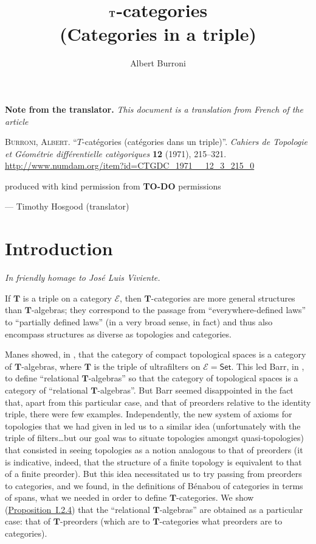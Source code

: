 \documentclass{article}
\title{$\TT$-categories\\(Categories in a triple)}
\author{Albert Burroni}
\date{}
\newcommand{\origcit}{%
  \textsc{Burroni, Albert.}
  ``$T$-catégories (catégories dans un triple)''.
  \emph{Cahiers de Topologie et Géométrie différentielle catègoriques} \textbf{12} (1971), 215--321.
  {\url{http://www.numdam.org/item?id=CTGDC_1971__12_3_215_0}}
}
\newenvironment{translator}[1]
  {\phantomsection\par\medskip\noindent\small\textbf{#1.}\itshape}
  {\par\medskip}
\newcommand{\oldpage}[1]{\marginpar{\footnotesize$\Big\vert$ \textit{p.~#1}}}
\newcommand{\todo}{{\color{purple}\textbf{TO-DO }}}
\newcommand{\TT}{\mathbf{T}}
\newcommand{\cat}[1]{\mathcal{#1}}
\newcommand{\Cat}[1]{\mathsf{#1}}
\begin{document}
\maketitle

\begin{translator}{Note from the translator}
  This document is a translation from French of the article

  \medskip
  {\normalfont\origcit}

  \medskip
  {\noindent}produced with kind permission from \todo{permissions}

  \hfill--- Timothy Hosgood (translator)
\end{translator}



\section*{Introduction}

\hfill\emph{In friendly homage to José Luis Viviente.}

\bigskip

\oldpage{215}
If $\TT$ is a triple on a category $\cat{E}$, then $\TT$-categories are more general structures than $\TT$-algebras; they correspond to the passage from ``everywhere-defined laws'' to ``partially defined laws'' (in a very broad sense, in fact) and thus also encompass structures as diverse as topologies and categories.

Manes showed, in \cite{Ma}, that the category of compact topological spaces is a category of $\TT$-algebras, where $\TT$ is the triple of ultrafilters on $\cat{E}=\Cat{Set}$.
This led Barr, in \cite{Ba}, to define ``relational $\TT$-algebras'' so that the category of topological spaces is a category of ``relational $\TT$-algebras''.
But Barr seemed disappointed in the fact that, apart from this particular case, and that of preorders relative to the identity triple, there were few examples.
Independently, the new system of axioms for topologies that we had given in \cite{Bu} led us to a similar idea (unfortunately with the triple of filters\ldots but our goal was to situate topologies amongst quasi-topologies) that consisted in seeing topologies as a notion analogous to that of preorders (it is indicative, indeed, that the structure of a finite topology is equivalent to that of a finite preorder).
But this idea necessitated us to try passing from preorders to categories, and we found, in the definitions of Bénabou \cite{Be} of categories in terms of spans, what we needed in order to define $\TT$-categories.
We show (\hyperref[proposition:i.2.4]{Proposition~I.2.4}) that the ``relational $\TT$-algebras'' are obtained as a particular case: that of $\TT$-preorders (which are to $\TT$-categories what preorders are to categories).
\end{document}
